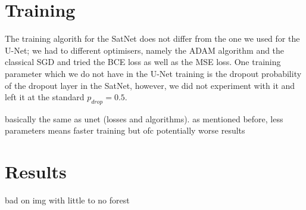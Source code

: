 \section{Training}
The training algorith for the SatNet does not differ from the one we used for the U-Net; we had to different optimisers, namely the ADAM algorithm and the classical SGD and tried the BCE loss as well as the MSE loss. One training parameter which we do not have in the U-Net training is the dropout probability of the dropout layer in the SatNet, however, we did not experiment with it and left it at the standard $p_{drop}=0.5$.

basically the same as unet (losses and algorithms). as mentioned before, less parameters means faster training but ofc potentially worse results\\
\section{Results}
bad on img with little to no forest\\
